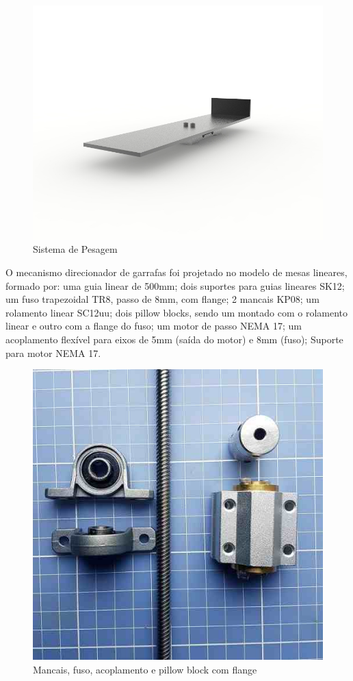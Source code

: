 \begin{figure}[!h]
	\centering
		\includegraphics[scale=0.3]{figuras/estrutura/3-Sistema-de-pesagem2.jpg}
	\caption{Sistema de Pesagem}
\end{figure}

O mecanismo direcionador de garrafas foi projetado no modelo de mesas lineares, formado por: uma guia linear de 500mm; dois suportes para guias lineares SK12; um fuso trapezoidal TR8, passo de 8mm, com flange; 2 mancais KP08; um rolamento linear SC12uu; dois pillow blocks, sendo um montado com o rolamento linear e outro com a flange do fuso;  um motor de passo NEMA 17; um acoplamento flexível para eixos de 5mm (saída do motor) e 8mm (fuso); Suporte para motor NEMA 17.

\begin{figure}[!h]
	\centering
		\includegraphics[scale=0.2]{figuras/estrutura/4-Mancais-fuso-acoplamento-pillow.jpg}
	\caption{Mancais, fuso, acoplamento e pillow block com flange}
\end{figure}

